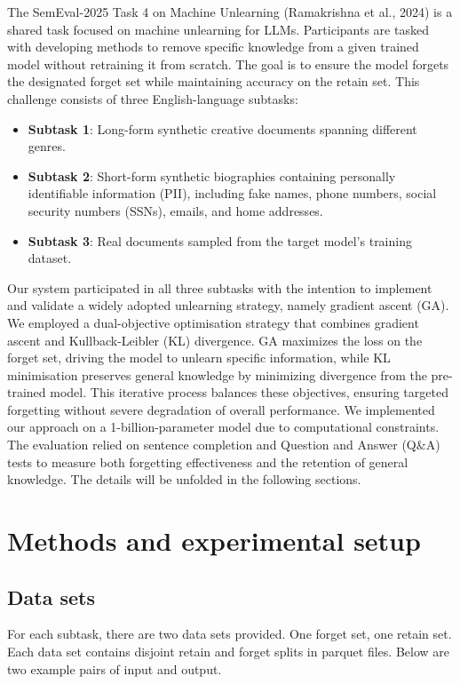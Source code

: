 \documentclass[11pt]{article}
\begin{document}
The SemEval-2025 Task 4 on Machine Unlearning (Ramakrishna et al., 2024) is a shared task focused on machine unlearning for LLMs. Participants are tasked with developing methods to remove specific knowledge from a given trained model without retraining it from scratch. The goal is to ensure the model forgets the designated forget set while maintaining accuracy on the retain set. This challenge consists of three English-language subtasks:
\begin{itemize}
    \item \textbf{Subtask 1}: Long-form synthetic creative documents spanning different genres. 
    \item \textbf{Subtask 2}: Short-form synthetic biographies containing personally identifiable information (PII), including fake names, phone numbers, social security numbers (SSNs), emails, and home addresses. 
    \item \textbf{Subtask 3}: Real documents sampled from the target model’s training dataset. 
\end{itemize}

Our system participated in all three subtasks with the intention to implement and validate a widely adopted unlearning strategy, namely gradient ascent (GA). We employed a dual-objective optimisation strategy that combines gradient ascent and Kullback-Leibler (KL) divergence. GA maximizes the loss on the forget set, driving the model to unlearn specific information, while KL minimisation preserves general knowledge by minimizing divergence from the pre-trained model. This iterative process balances these objectives, ensuring targeted forgetting without severe degradation of overall performance. We implemented our approach on a 1-billion-parameter model due to computational constraints. The evaluation relied on sentence completion and Question and Answer (Q\&A) tests to measure both forgetting effectiveness and the retention of general knowledge. The details will be unfolded in the following sections.



\section{Methods and experimental setup}

\subsection*{Data sets}
For each subtask, there are two data sets provided. One forget set, one retain set. Each data set contains disjoint retain and forget splits in parquet files. Below are two example pairs of input and output.
\end{document}
